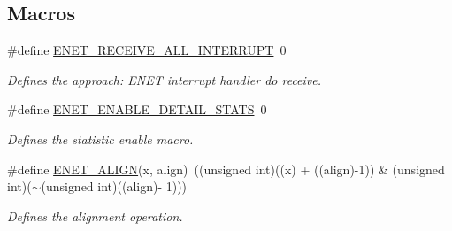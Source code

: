 \subsection*{Macros}
\begin{DoxyCompactItemize}
\item 
\#define \hyperlink{group__enet__driver_gaa41bd83c22bd49ef3849d887ae18d0fb}{E\+N\+E\+T\+\_\+\+R\+E\+C\+E\+I\+V\+E\+\_\+\+A\+L\+L\+\_\+\+I\+N\+T\+E\+R\+R\+U\+PT}~0\hypertarget{group__enet__driver_gaa41bd83c22bd49ef3849d887ae18d0fb}{}\label{group__enet__driver_gaa41bd83c22bd49ef3849d887ae18d0fb}

\begin{DoxyCompactList}\small\item\em Defines the approach\+: E\+N\+ET interrupt handler do receive. \end{DoxyCompactList}\item 
\#define \hyperlink{group__enet__driver_ga5791c510ab826125090d1e5cde1d0d8c}{E\+N\+E\+T\+\_\+\+E\+N\+A\+B\+L\+E\+\_\+\+D\+E\+T\+A\+I\+L\+\_\+\+S\+T\+A\+TS}~0\hypertarget{group__enet__driver_ga5791c510ab826125090d1e5cde1d0d8c}{}\label{group__enet__driver_ga5791c510ab826125090d1e5cde1d0d8c}

\begin{DoxyCompactList}\small\item\em Defines the statistic enable macro. \end{DoxyCompactList}\item 
\#define \hyperlink{group__enet__driver_ga49324c817c2810ff85f4dfe5490d18eb}{E\+N\+E\+T\+\_\+\+A\+L\+I\+GN}(x,  align)~((unsigned int)((x) + ((align)-\/1)) \& (unsigned int)($\sim$(unsigned int)((align)-\/ 1)))\hypertarget{group__enet__driver_ga49324c817c2810ff85f4dfe5490d18eb}{}\label{group__enet__driver_ga49324c817c2810ff85f4dfe5490d18eb}

\begin{DoxyCompactList}\small\item\em Defines the alignment operation. \end{DoxyCompactList}\end{DoxyCompactItemize}
